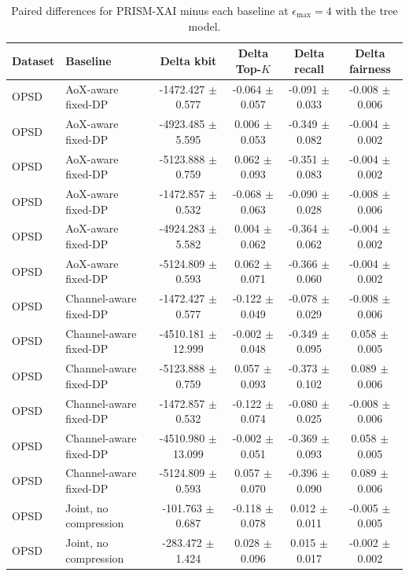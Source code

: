 \begin{table}[t]
\caption{Paired differences for PRISM-XAI minus each baseline at $\epsilon_{\max}=4$ with the tree model.}
\label{tab:paired-differences}
\centering
\scriptsize
\setlength{\tabcolsep}{3pt}
\begin{tabular}{llcccc}
\toprule
Dataset & Baseline & Delta kbit & Delta Top-$K$ & Delta recall & Delta fairness \\
\midrule
OPSD & AoX-aware fixed-DP & -1472.427 $\pm$ 0.577 & -0.064 $\pm$ 0.057 & -0.091 $\pm$ 0.033 & -0.008 $\pm$ 0.006 \\
OPSD & AoX-aware fixed-DP & -4923.485 $\pm$ 5.595 & 0.006 $\pm$ 0.053 & -0.349 $\pm$ 0.082 & -0.004 $\pm$ 0.002 \\
OPSD & AoX-aware fixed-DP & -5123.888 $\pm$ 0.759 & 0.062 $\pm$ 0.093 & -0.351 $\pm$ 0.083 & -0.004 $\pm$ 0.002 \\
OPSD & AoX-aware fixed-DP & -1472.857 $\pm$ 0.532 & -0.068 $\pm$ 0.063 & -0.090 $\pm$ 0.028 & -0.008 $\pm$ 0.006 \\
OPSD & AoX-aware fixed-DP & -4924.283 $\pm$ 5.582 & 0.004 $\pm$ 0.062 & -0.364 $\pm$ 0.062 & -0.004 $\pm$ 0.002 \\
OPSD & AoX-aware fixed-DP & -5124.809 $\pm$ 0.593 & 0.062 $\pm$ 0.071 & -0.366 $\pm$ 0.060 & -0.004 $\pm$ 0.002 \\
OPSD & Channel-aware fixed-DP & -1472.427 $\pm$ 0.577 & -0.122 $\pm$ 0.049 & -0.078 $\pm$ 0.029 & -0.008 $\pm$ 0.006 \\
OPSD & Channel-aware fixed-DP & -4510.181 $\pm$ 12.999 & -0.002 $\pm$ 0.048 & -0.349 $\pm$ 0.095 & 0.058 $\pm$ 0.005 \\
OPSD & Channel-aware fixed-DP & -5123.888 $\pm$ 0.759 & 0.057 $\pm$ 0.093 & -0.373 $\pm$ 0.102 & 0.089 $\pm$ 0.006 \\
OPSD & Channel-aware fixed-DP & -1472.857 $\pm$ 0.532 & -0.122 $\pm$ 0.074 & -0.080 $\pm$ 0.025 & -0.008 $\pm$ 0.006 \\
OPSD & Channel-aware fixed-DP & -4510.980 $\pm$ 13.099 & -0.002 $\pm$ 0.051 & -0.369 $\pm$ 0.093 & 0.058 $\pm$ 0.005 \\
OPSD & Channel-aware fixed-DP & -5124.809 $\pm$ 0.593 & 0.057 $\pm$ 0.070 & -0.396 $\pm$ 0.090 & 0.089 $\pm$ 0.006 \\
OPSD & Joint, no compression & -101.763 $\pm$ 0.687 & -0.118 $\pm$ 0.078 & 0.012 $\pm$ 0.011 & -0.005 $\pm$ 0.005 \\
OPSD & Joint, no compression & -283.472 $\pm$ 1.424 & 0.028 $\pm$ 0.096 & 0.015 $\pm$ 0.017 & -0.002 $\pm$ 0.002 \\

\end{tabular}
\end{table}
